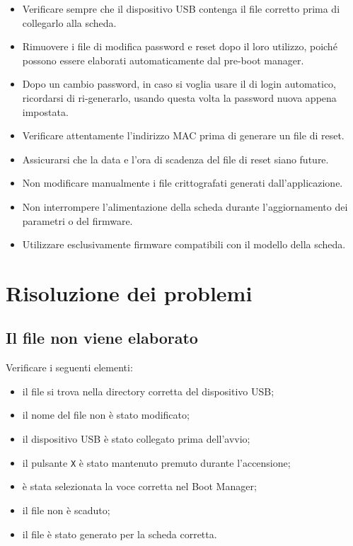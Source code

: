 \documentclass[11pt,a4paper]{article}
\begin{document}
\begin{itemize}
    \item Verificare sempre che il dispositivo USB contenga il file
    corretto prima di collegarlo alla scheda.
    
    \item Rimuovere i file di modifica password e reset
    dopo il loro utilizzo, poiché possono essere elaborati
    automaticamente dal pre-boot manager.
    
    \item Dopo un cambio password, in caso si voglia usare il di login automatico,
    ricordarsi di ri-generarlo, usando questa volta la password nuova appena impostata.

    \item Verificare attentamente l'indirizzo MAC prima di generare
    un file di reset.
    
    \item Assicurarsi che la data e l'ora di scadenza del file di
    reset siano future.
    
    \item Non modificare manualmente i file crittografati generati
    dall'applicazione.
    
    \item Non interrompere l'alimentazione della scheda durante
    l'aggiornamento dei parametri o del firmware.
    
    \item Utilizzare esclusivamente firmware compatibili con il
    modello della scheda.
\end{itemize}

\section{Risoluzione dei problemi}

\subsection{Il file non viene elaborato}

Verificare i seguenti elementi:

\begin{itemize}
    \item il file si trova nella directory corretta del dispositivo USB;
    \item il nome del file non è stato modificato;
    \item il dispositivo USB è stato collegato prima dell'avvio;
    \item il pulsante \texttt{X} è stato mantenuto premuto
    durante l'accensione;
    \item è stata selezionata la voce corretta nel Boot Manager;
    \item il file non è scaduto;
    \item il file è stato generato per la scheda corretta.
\end{itemize}
\end{document}

